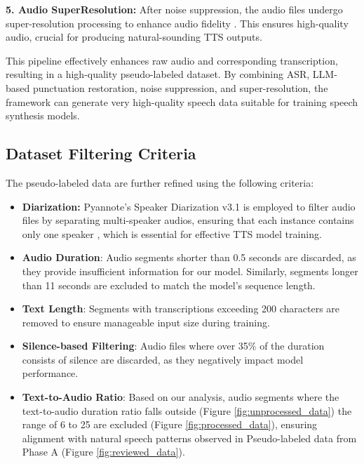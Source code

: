 \textbf{5. Audio SuperResolution:} After noise suppression, the audio files undergo super-resolution processing to enhance audio fidelity \cite{liu2021voicefixer}. This ensures high-quality audio, crucial for producing natural-sounding TTS outputs.


This pipeline effectively enhances raw audio and corresponding transcription, resulting in a high-quality pseudo-labeled dataset. By combining ASR, LLM-based punctuation restoration, noise suppression, and super-resolution, the framework can generate very high-quality speech data suitable for training speech synthesis models.

\subsection{Dataset Filtering Criteria}
The pseudo-labeled data are further refined using the following criteria:

\begin{itemize}
    \item\textbf{Diarization:} Pyannote's Speaker Diarization v3.1  is employed to filter audio files by separating multi-speaker audios, ensuring that each instance contains only one speaker \cite{Plaquet23}, which is essential for effective TTS model training.

    \item \textbf{Audio Duration}: Audio segments shorter than 0.5 seconds are discarded, as they provide insufficient information for our model. Similarly, segments longer than 11 seconds are excluded to match the model’s sequence length.
    
    \item \textbf{Text Length}: Segments with transcriptions exceeding 200 characters are removed to ensure manageable input size during training.
    \item \textbf{Silence-based Filtering}: Audio files where over 35\% of the duration consists of silence are discarded, as they negatively impact model performance.
    \item \textbf{Text-to-Audio Ratio}: Based on our analysis, audio segments where the text-to-audio duration ratio falls outside (Figure \ref{fig:unprocessed_data}) the range of 6 to 25 are excluded (Figure \ref{fig:processed_data}), ensuring alignment with natural speech patterns observed in Pseudo-labeled data from Phase A (Figure \ref{fig:reviewed_data}).
\end{itemize}




